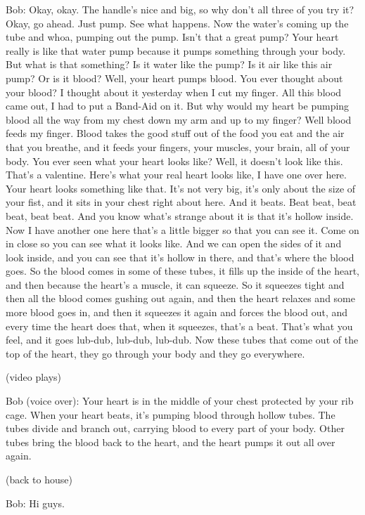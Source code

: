 Bob: Okay, okay. The handle's nice and big, so why don't all three of you try it? Okay, go ahead. Just pump. See what happens. Now the water's coming up the tube and whoa, pumping out the pump. Isn't that a great pump? Your heart really is like that water pump because it pumps something through your body. But what is that something? Is it water like the pump? Is it air like this air pump? Or is it blood? Well, your heart pumps blood. You ever thought about your blood? I thought about it yesterday when I cut my finger. All this blood came out, I had to put a Band-Aid on it. But why would my heart be pumping blood all the way from my chest down my arm and up to my finger? Well blood feeds my finger. Blood takes the good stuff out of the food you eat and the air that you breathe, and it feeds your fingers, your muscles, your brain, all of your body. You ever seen what your heart looks like? Well, it doesn't look like this. That's a valentine. Here's what your real heart looks like, I have one over here. Your heart looks something like that. It's not very big, it's only about the size of your fist, and it sits in your chest right about here. And it beats. Beat beat, beat beat, beat beat. And you know what's strange about it is that it's hollow inside. Now I have another one here that's a little bigger so that you can see it. Come on in close so you can see what it looks like. And we can open the sides of it and look inside, and you can see that it's hollow in there, and that's where the blood goes. So the blood comes in some of these tubes, it fills up the inside of the heart, and then because the heart's a muscle, it can squeeze. So it squeezes tight and then all the blood comes gushing out again, and then the heart relaxes and some more blood goes in, and then it squeezes it again and forces the blood out, and every time the heart does that, when it squeezes, that's a beat. That's what you feel, and it goes lub-dub, lub-dub, lub-dub. Now these tubes that come out of the top of the heart, they go through your body and they go everywhere.

(video plays)

Bob (voice over): Your heart is in the middle of your chest protected by your rib cage. When your heart beats, it's pumping blood through hollow tubes. The tubes divide and branch out, carrying blood to every part of your body. Other tubes bring the blood back to the heart, and the heart pumps it out all over again.

(back to house)

Bob: Hi guys.

